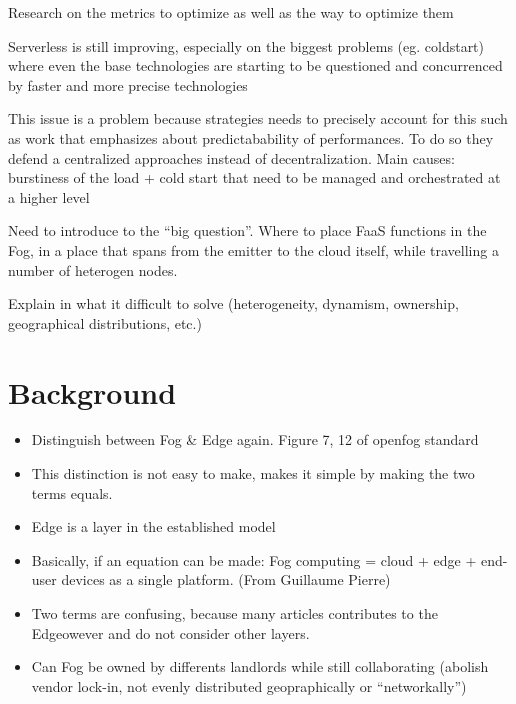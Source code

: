 \documentclass[11pt]{sdm}
\begin{document}
\begin{itemize}
{    \item Research on the metrics to optimize as well as the way to optimize them
    \item Serverless is still improving, especially on the biggest problems (eg. coldstart) where even the base technologies are starting to be questioned and concurrenced by faster and more precise technologies \citet{hykes_solomon_2019}
    \item This issue is a problem because strategies needs to precisely account for this such as  work that emphasizes about predictabability of performances. To do so they defend a centralized approaches instead of decentralization. Main causes: burstiness of the load + cold start that need to be managed and orchestrated at a higher level
    \item Need to introduce to the ``big question''. Where to place FaaS functions in the Fog, in a place that spans from the emitter to the cloud itself, while travelling a number of heterogen nodes.
    \item Explain in what it difficult to solve (heterogeneity, dynamism, ownership, geographical distributions, etc.)
    }

    
\end{itemize}

\section{Background}
\begin{itemize}
    \item Distinguish between Fog \& Edge again. Figure 7, 12 of  openfog standard
    \item This distinction is not easy to make, \citet{baresi_paps_2019} makes it simple by making the two terms equals.
    \item Edge is a layer in the established model \cite{wikipedia_edge_2021}
    \item Basically, if an equation can be made: Fog computing = cloud + edge + end-user devices as a single platform. (From Guillaume Pierre)
    \item Two terms are confusing, because many articles contributes to the Edgeowever and do not consider other layers.
    \item Can Fog be owned by differents landlords while still collaborating (abolish vendor lock-in, not evenly distributed geopraphically or ``networkally'')
\end{itemize}
\end{document}
